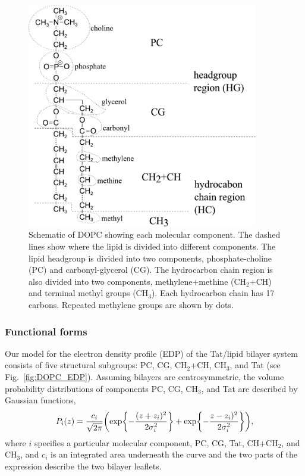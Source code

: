 \begin{figure}[htbp]
  \centering
  \includegraphics[width=0.9\textwidth]{figures/Tat/MMs/dopc_schematic.pdf}
  \caption{Schematic of DOPC showing each molecular component. The dashed lines 
           show where the lipid is divided into different components. 
           The lipid headgroup
           is divided into two components, phosphate-choline (PC) and carbonyl-glycerol (CG). 
           The hydrocarbon chain region is also divided
           into two components, methylene+methine (CH$_2$+CH) and terminal methyl groups (CH$_3$).
           Each hydrocarbon chain has 17 carbons. Repeated methylene groups 
           are shown by dots.}
  \label{fig:dopc_schematic}
\end{figure}

\subsubsection{Functional forms}
Our model for the electron density profile (EDP)
of the Tat/lipid bilayer system consists of five structural subgroups: PC, CG,
CH$_2$+CH, CH$_3$, and Tat (see Fig.~\ref{fig:DOPC_EDP}).
Assuming bilayers are centrosymmetric, 
the volume probability distributions of components PC, CG, CH$_3$, and Tat 
are described by Gaussian functions,
\begin{equation}
  P_i(z)=\frac{c_i}{\sqrt{2\pi}}\mathopen{}\left( 
    \exp\mathopen{}\left\lbrace -\frac{(z+z_i)^2}{2\sigma_i^2} \right\rbrace\mathclose{}
	+ \exp\mathopen{}\left\lbrace -\frac{z-z_i)^2}{2\sigma_i^2} \right\rbrace\mathclose{}
   \right)\mathclose{},
\end{equation}
where $i$ specifies a particular molecular component,
PC, CG, Tat, CH+CH$_2$, and CH$_3$, and
$c_i$ is an integrated area underneath the curve and the two parts of the 
expression describe the two bilayer leaflets. 

